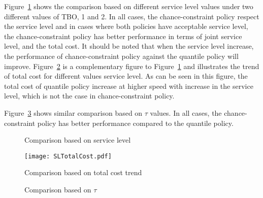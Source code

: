 \documentclass[10pt]{article}
\begin{document}
Figure~\ref{fig:SLComp} shows the comparison based on different service level values under two different values of TBO, 1 and 2. In all cases, the chance-constraint policy respect the service level and in cases where both policies have acceptable service level, the chance-constraint policy has better performance in terms of joint service level, and the total cost. It should be noted that when the service level increase, the performance of chance-constraint policy against the quantile policy will improve. Figure~\ref{fig:SLTotalCost} is a complementary figure to Figure~\ref{fig:SLComp} and illustrates the trend of total cost for different values service level. As can be seen in this figure, the total cost of quantile policy increase at higher speed with increase in the service level, which is not the case in chance-constraint policy.

Figure~\ref{fig:TIComp} shows similar comparison based on $\tau$ values. In all cases, the chance-constraint policy has better performance compared to the quantile policy.

\begin{figure}%
    \centering
    \caption{Comparison based on service level}%
    \label{fig:SLComp}%
\end{figure}

\begin{figure}[!h]
\begin{center}
\texttt{[image: SLTotalCost.pdf]}
\caption{Comparison based on total cost trend} 
\label{fig:SLTotalCost}
\end{center}
\end{figure}


\begin{figure}%
    \centering
    \caption{Comparison based on $\tau$}%
    \label{fig:TIComp}%
\end{figure}
\end{document}
